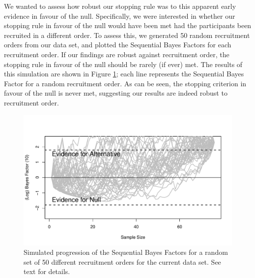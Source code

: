 \documentclass[a4paper, jou, natbib]{apa6}
\begin{document}
We wanted to assess how robust our stopping rule was to this apparent early evidence in favour of the null. Specifically, we were interested in whether our stopping rule in favour of the null would have been met had the participants been recruited in a different order. To assess this, we generated 50 random recruitment orders from our data set, and plotted the Sequential Bayes Factors for each recruitment order. If our findings are robust against recruitment order, the stopping rule in favour of the null should be rarely (if ever) met.  The results of this simulation are shown in Figure \ref{fig:recruitmentOrder}; each line represents the Sequential Bayes Factor for a random recruitment order. As can be seen, the stopping criterion in favour of the null is never met, suggesting our results are indeed robust to recruitment order.


\begin{figure}
\begin{center}
\includegraphics[width = 0.5 \textwidth]{Images/recruitmentOrder.pdf}
\caption{Simulated progression of the Sequential Bayes Factors for a random set of 50 different recruitment orders for the current data set. See text for details.}
\label{fig:recruitmentOrder}
\end{center}
\end{figure}











\end{document}
